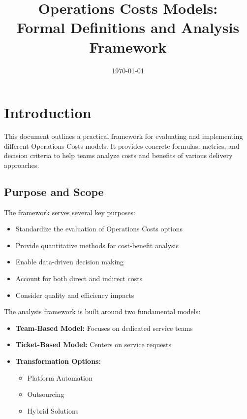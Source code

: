 \documentclass[12pt,a4paper]{article}
\title{\textbf{\LARGE Operations Costs Models:\\[0.3em] Formal Definitions and Analysis Framework}}
\author{\Large}
\date{\today}
\newenvironment{definition}[1]
{\begin{mdframed}[style=definitionstyle,frametitle={Definition: #1}]}
{\end{mdframed}}
\newenvironment{explanation}
{\begin{mdframed}[style=explanationstyle,frametitle={Explanation}]}
{\end{mdframed}}
\begin{document}
\maketitle
\thispagestyle{empty}
\tableofcontents
\clearpage

\section{Introduction}
This document outlines a practical framework for evaluating and implementing different Operations Costs models. It provides concrete formulas, metrics, and decision criteria to help teams analyze costs and benefits of various delivery approaches. 

\subsection{Purpose and Scope}
\begin{definition}{Framework Purpose}
The framework serves several key purposes:
\begin{itemize}
    \item Standardize the evaluation of Operations Costs options
    \item Provide quantitative methods for cost-benefit analysis
    \item Enable data-driven decision making
    \item Account for both direct and indirect costs
    \item Consider quality and efficiency impacts
\end{itemize}
\end{definition}

\begin{explanation}
The analysis framework is built around two fundamental models:
\begin{itemize}
    \item \textbf{Team-Based Model:} Focuses on dedicated service teams
    \item \textbf{Ticket-Based Model:} Centers on service requests
    \item \textbf{Transformation Options:}
    \begin{itemize}
        \item Platform Automation
        \item Outsourcing
        \item Hybrid Solutions
    \end{itemize}
\end{itemize}
\end{explanation}
\end{document}
